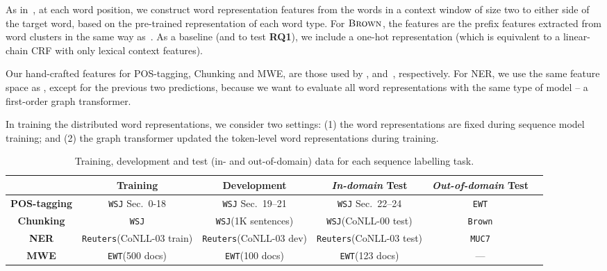 \documentclass[11pt]{article}
\newcommand{\RQ}[1][1]{\textbf{RQ#1}\xspace}
\newcommand{\dataset}[1]{\texttt{#1}\xspace}
\newcommand{\EWT}{\dataset{EWT}}
\newcommand{\WSJ}{\dataset{WSJ}}
\newcommand{\Brown}{\dataset{Brown}}
\newcommand{\Reuters}{\dataset{Reuters}}
\newcommand{\MUC}{\dataset{MUC7}}
\newcommand{\method}[2][]{\ensuremath{\textsc{#2#1}}\xspace}
\newcommand{\brown}[1][]{\method[\ensuremath{_{#1}}]{Brown}}
\newcommand{\task}[1]{\textsf{#1}\xspace}
\newcommand{\pos}{\task{POS-tagging}}
\newcommand{\chunking}{\task{Chunking}}
\newcommand{\ner}{\task{NER}}
\newcommand{\mwe}{\task{MWE}}
\begin{document}


As in~, at each word position, we construct word
representation features from the words in a context window of size two
to either side of the target word, based on the pre-trained
representation of each word type.  For \brown, the features are the
prefix features extracted from word clusters in the same way
as~. As a baseline (and to test \RQ[1]), we include a one-hot
representation (which is equivalent to a linear-chain CRF with only
lexical context features).

Our hand-crafted features for \pos, \chunking and \mwe, are those used
by , 
and~, respectively. For \ner, we use the same feature
space as , except for the previous two
predictions, because we want to evaluate all word representations with
the same type of model -- a first-order graph transformer.

In training the distributed word representations, we consider two
settings: (1) the word representations are fixed during sequence model
training; and (2) the graph transformer updated the token-level word
representations during training.


\begin{table}
\begin{small}
\begin{tabular}{@{}c@{~~}c@{~~}c@{~~}c@{~~}c@{~~}c@{}}
\hline
			& \textbf{Training} & \textbf{Development} & \textbf{\textit{In-domain} Test} & \textbf{\textit{Out-of-domain} Test} \\ \hline
\textbf{\pos} & \WSJ Sec.\ 0-18  & \WSJ Sec.\ 19--21 & \WSJ Sec.\ 22--24 & \EWT  \\
\textbf{\chunking} & \WSJ & \WSJ (1K sentences) & \WSJ (CoNLL-00 test) & \Brown \\
\textbf{\ner} & \Reuters (CoNLL-03 train) & \Reuters (CoNLL-03 dev) & \Reuters (CoNLL-03 test) & \MUC  \\
\textbf{\mwe} & \EWT (500 docs) & \EWT (100 docs)  & \EWT (123 docs) & --- \\
\hline
\end{tabular}
\caption{Training, development and test (in- and out-of-domain) data for each sequence labelling
  task.}
\label{datasplit}
\end{small}
\end{table}
\end{document}
